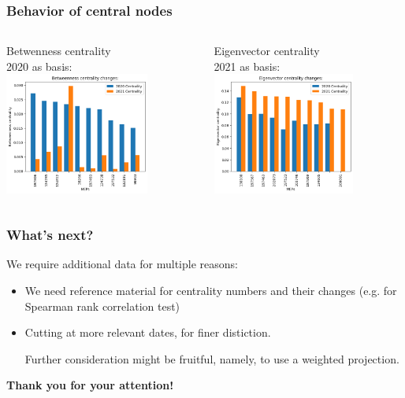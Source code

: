 \documentclass{beamer}
\begin{document}
\begin{frame}
\frametitle{Behavior of central nodes}
\begin{columns}
\column{5cm}
Betwenness centrality \\
2020 as basis:
\includegraphics[height=4cm]{Betweeness_2020asBasis.png}

\pause \column{5cm}
Eigenvector centrality \\
2021 as basis:
\includegraphics[height=4cm]{Eigenvector_2021asBasis.png}

\end{columns}
\end{frame}


\begin{frame}
\frametitle{What's next?}

We require additional data for multiple reasons:

\begin{itemize}
	\item We need reference material for centrality numbers and their changes (e.g. for Spearman rank correlation test) 
	\item Cutting at more relevant dates, for finer distiction.
	
\bigskip

Further consideration might be fruitful, namely, to use a weighted projection.

\end{itemize}
\end{frame}



\begin{frame}
\begin{center}
\Large{\textbf{Thank you for your attention!}}
\end{center}
\end{frame}
\end{document}
